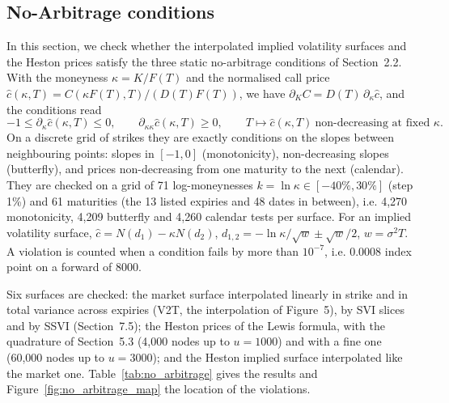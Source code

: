 \documentclass[11pt,a4paper]{article}
\theoremstyle{plain}
\theoremstyle{definition}
\begin{document}
\subsection{No-Arbitrage conditions}
In this section, we check whether the interpolated implied volatility surfaces and the Heston prices satisfy the
three static no-arbitrage conditions of Section~2.2. With the moneyness $\kappa = K/F(T)$ and the normalised call
price $\hat c(\kappa, T) = C(\kappa F(T), T) / (D(T) F(T))$, we have $\partial_K C = D(T)\,\partial_\kappa \hat c$, and the
conditions read
\begin{equation}
-1 \le \partial_\kappa \hat c(\kappa, T) \le 0, \qquad \partial_{\kappa\kappa} \hat c(\kappa, T) \ge 0, \qquad
T \mapsto \hat c(\kappa, T) \ \text{non-decreasing at fixed } \kappa .
\end{equation}
On a discrete grid of strikes they are exactly conditions on the slopes between neighbouring points: slopes in
$[-1, 0]$ (monotonicity), non-decreasing slopes (butterfly), and prices non-decreasing from one maturity to the next
(calendar). They are checked on a grid of 71 log-moneynesses $k = \ln\kappa \in [-40\%, 30\%]$ (step 1\%) and 61
maturities (the 13 listed expiries and 48 dates in between), i.e. 4{,}270 monotonicity, 4{,}209 butterfly and 4{,}260
calendar tests per surface. For an implied volatility surface,
$\hat c = N(d_1) - \kappa N(d_2)$, $d_{1,2} = -\ln\kappa / \sqrt{w} \pm \sqrt{w}/2$, $w = \sigma^2 T$. A violation is counted
when a condition fails by more than $10^{-7}$, i.e. 0.0008 index point on a forward of 8000.

Six surfaces are checked: the market surface interpolated linearly in strike and in total variance across expiries
(V2T, the interpolation of Figure~5), by SVI slices and by SSVI (Section~7.5); the Heston prices of the Lewis formula,
with the quadrature of Section~5.3 (4{,}000 nodes up to $u = 1000$) and with a fine one (60{,}000 nodes up to
$u = 3000$); and the Heston implied surface interpolated like the market one. Table~\ref{tab:no_arbitrage} gives the
results and Figure~\ref{fig:no_arbitrage_map} the location of the violations.
\end{document}

